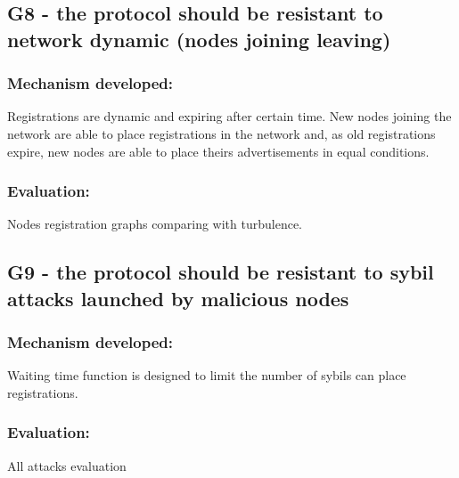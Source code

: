 \subsection{G8 - the protocol should be resistant to network dynamic (nodes joining leaving)}

\subsubsection{Mechanism developed:} 

Registrations are dynamic and expiring after certain time. 
New nodes joining the network are able to place registrations in the network and, as old registrations expire,  new nodes are able to place theirs advertisements in equal conditions.

\subsubsection{Evaluation: }

Nodes registration graphs comparing with turbulence.

\subsection{G9 - the protocol should be resistant to sybil attacks launched by malicious nodes}

\subsubsection{Mechanism developed:} 

Waiting time function is designed to limit the number of sybils can place registrations.

\subsubsection{Evaluation: }

All attacks evaluation

